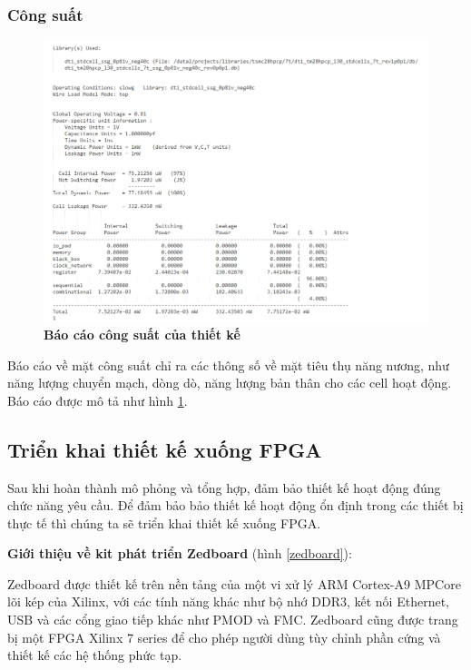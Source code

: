 \subsubsection{Công suất}
\begin{figure}[H]
    \centering
    \includegraphics[width=14cm]{Images/Chuong5/syn/power.png}
    \caption[Báo cáo công suất của thiết kế]{\bfseries \fontsize{12pt}{0pt}\selectfont Báo cáo công suất của thiết kế}
    \label{syn_power}
\end{figure}

Báo cáo về mặt công suất chỉ ra các thông số về mặt tiêu thụ năng nương, như năng 
lượng chuyển mạch, dòng dò, năng lượng bản thân cho các cell hoạt động. Báo cáo được mô tả như hình \ref{syn_power}.
\subsection{Triển khai thiết kế xuống FPGA}
Sau khi hoàn thành mô phỏng và tổng hợp, đảm bảo thiết kế hoạt động đúng chức 
năng yêu cầu. Để đảm bảo bảo thiết kế hoạt động ổn định trong các thiết bị thực tế thì chúng ta sẽ triển khai thiết kế xuống FPGA.

\textbf{Giới thiệu về kit phát triển Zedboard} (hình \ref{zedboard}):

Zedboard được thiết kế trên nền tảng của một vi xử lý ARM Cortex-A9 MPCore lõi kép của Xilinx, với các tính năng khác như bộ nhớ DDR3, kết nối Ethernet, USB và các cổng giao tiếp khác như PMOD và FMC. Zedboard cũng được trang bị một FPGA Xilinx 7 series để cho phép người dùng tùy chỉnh phần cứng và thiết kế các hệ thống phức tạp.

